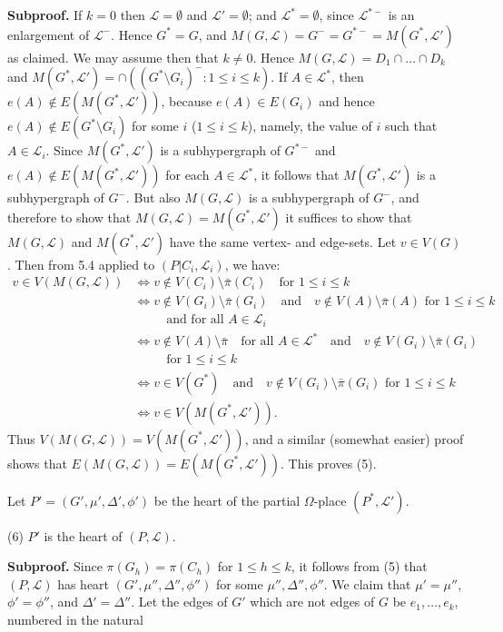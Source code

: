 \textbf{Subproof.} If $k = 0$ then $\mathscr{L} = \emptyset$ and $\mathscr{L}' = \emptyset$; and $\mathscr{L}^* = \emptyset$, since $\mathscr{L}^{*-}$ is an enlargement of $\mathscr{L}^-$. Hence $G^* = G$, and $M(G, \mathscr{L}) = G^- = G^{*-} = M(G^*, \mathscr{L}')$ as claimed. We may assume then that $k \ne 0$. Hence $M(G, \mathscr{L}) = D_1 \cap \dots \cap D_k$ and $M(G^*, \mathscr{L}') = \cap ((G^* \setminus G_i)^- : 1 \le i \le k)$. If $A \in \mathscr{L}^*$, then $e(A) \notin E(M(G^*, \mathscr{L}'))$, because $e(A) \in E(G_i)$ and hence $e(A) \notin E(G^* \setminus G_i)$ for some $i$ ($1 \le i \le k$), namely, the value of $i$ such that $A \in \mathscr{L}_i$. Since $M(G^*, \mathscr{L}')$ is a subhypergraph of $G^{*-}$ and $e(A) \notin E(M(G^*, \mathscr{L}'))$ for each $A \in \mathscr{L}^*$, it follows that $M(G^*, \mathscr{L}')$ is a subhypergraph of $G^-$. But also $M(G, \mathscr{L})$ is a subhypergraph of $G^-$, and therefore to show that $M(G, \mathscr{L}) = M(G^*, \mathscr{L}')$ it suffices to show that $M(G, \mathscr{L})$ and $M(G^*, \mathscr{L}')$ have the same vertex- and edge-sets. Let $v \in V(G)$. Then from 5.4 applied to $(P|C_i, \mathscr{L}_i)$, we have:
\begin{align*}
v \in V(M(G, \mathscr{L})) &\Leftrightarrow v \notin V(C_i) \setminus \bar{\pi}(C_i) \quad \text{for } 1 \le i \le k \\
&\Leftrightarrow v \notin V(G_i) \setminus \bar{\pi}(G_i) \quad \text{and} \quad v \notin V(A) \setminus \bar{\pi}(A) \text{ for } 1 \le i \le k \\
&\phantom{\Leftrightarrow} \quad \text{and for all } A \in \mathscr{L}_i \\
&\Leftrightarrow v \notin V(A) \setminus \bar{\pi} \quad \text{for all } A \in \mathscr{L}^* \quad \text{and} \quad v \notin V(G_i) \setminus \bar{\pi}(G_i) \\
&\phantom{\Leftrightarrow} \quad \text{for } 1 \le i \le k \\
&\Leftrightarrow v \in V(G^*) \quad \text{and} \quad v \notin V(G_i) \setminus \bar{\pi}(G_i) \text{ for } 1 \le i \le k \\
&\Leftrightarrow v \in V(M(G^*, \mathscr{L}')).
\end{align*}
Thus $V(M(G, \mathscr{L})) = V(M(G^*, \mathscr{L}'))$, and a similar (somewhat easier) proof shows that $E(M(G, \mathscr{L})) = E(M(G^*, \mathscr{L}'))$. This proves (5).

Let $P' = (G', \mu', \Delta', \phi')$ be the heart of the partial $\Omega$-place $(P^*, \mathscr{L}')$.

\hspace*{12pt}(6) $P'$ is the heart of $(P, \mathscr{L})$.

\textbf{Subproof.} Since $\pi(G_h) = \pi(C_h)$ for $1 \le h \le k$, it follows from (5) that $(P, \mathscr{L})$ has heart $(G', \mu'', \Delta'', \phi'')$ for some $\mu'', \Delta'', \phi''$. We claim that $\mu' = \mu''$, $\phi' = \phi''$, and $\Delta' = \Delta''$. Let the edges of $G'$ which are not edges of $G$ be $e_1, \dots, e_k$, numbered in the natural
